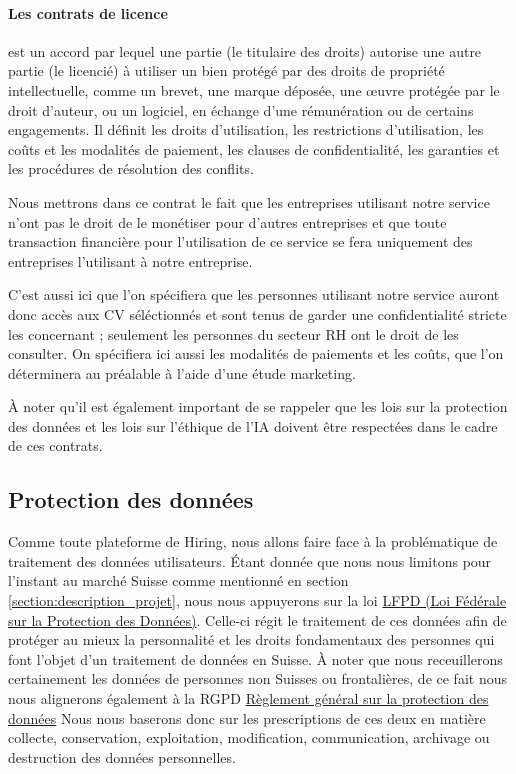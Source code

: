 \paragraph{Les contrats de licence} est un accord par lequel une partie (le titulaire des droits) autorise une autre partie (le licencié) à utiliser un bien protégé par des droits de propriété intellectuelle, comme un brevet, une marque déposée, une œuvre protégée par le droit d'auteur, ou un logiciel, en échange d'une rémunération ou de certains engagements. Il définit les droits d'utilisation, les restrictions d'utilisation, les coûts et les modalités de paiement, les clauses de confidentialité, les garanties et les procédures de résolution des conflits.

Nous mettrons dans ce contrat le fait que les entreprises utilisant notre service n'ont pas le droit de le monétiser pour d'autres entreprises et que toute transaction financière pour l'utilisation de ce service se fera uniquement des entreprises l'utilisant à notre entreprise. \newline

C'est aussi ici que l'on spécifiera que les personnes utilisant notre service auront donc accès aux CV séléctionnés et sont tenus de garder une confidentialité stricte les concernant ; seulement les personnes du secteur RH ont le droit de les consulter. On spécifiera ici aussi les modalités de paiements et les coûts, que l'on déterminera au préalable à l'aide d'une étude marketing.

À noter qu'il est également important de se rappeler que les lois sur la protection des données et les lois sur l'éthique de l'IA doivent être respectées dans le cadre de ces contrats.



\subsection{Protection des données}\label{subsection:protection_des_donnees}

 Comme toute plateforme de Hiring, nous allons faire face à la problématique de traitement des données utilisateurs. Étant donnée que nous nous limitons pour l'instant au marché Suisse comme mentionné en section \ref{section:description_projet}, nous nous appuyerons sur la loi \href{https://www.fedlex.admin.ch/eli/cc/1993/1945_1945_1945/fr}{LFPD (Loi Fédérale
sur la Protection des Données)}. Celle-ci régit le traitement de ces données afin de protéger au mieux la personnalité et les droits fondamentaux des personnes qui font l’objet d’un traitement de données en Suisse. À noter que nous receuillerons certainement les données de personnes non Suisses ou frontalières, de ce fait nous nous alignerons également à la RGPD \href{https://www.edoeb.admin.ch/edoeb/fr/home/documentation/datenschutz/Datenschutz%20-%20International/DSGVO.html}{Règlement général sur la protection des données}\newline 
Nous nous baserons donc sur les prescriptions de ces deux en matière collecte, conservation, exploitation, modification,  communication, archivage ou destruction des données personnelles.\newline

